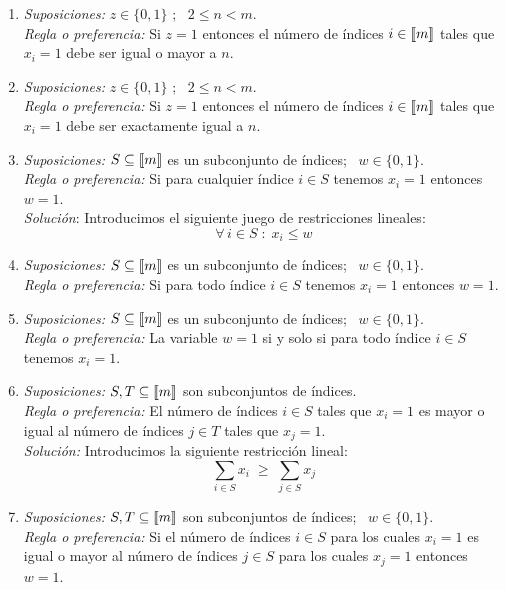 \documentclass[ a4paper, twoside, 11pt]{article}
\begin{document}
\begin{problem}
\begin{enumerate}[label=\alph*)]
\item \emph{Suposiciones:} $z \in \{ 0, 1\}$ ; \, $2 \leq n < m$. \\
\emph{Regla o preferencia:} Si $z = 1$ entonces el n\'umero de \'indices $i \in \llbracket m \rrbracket$ tales que $x_i = 1$ debe ser igual o mayor a $n$. 

\item \emph{Suposiciones:} $z \in \{ 0, 1\}$ ; \, $2 \leq n < m$. \\
\emph{Regla o preferencia:} Si $z = 1$ entonces el n\'umero de \'indices $i \in \llbracket m \rrbracket$ tales que $x_i = 1$ debe ser exactamente igual a $n$. 

\item \emph{Suposiciones:} $S \subseteq \llbracket m \rrbracket$ es un subconjunto de \'indices; \, $w \in \{ 0, 1\}$. \\
\emph{Regla o preferencia:} Si para cualquier \'indice $i \in S$ tenemos $x_i = 1$ entonces $w = 1$. \\[1ex]
\emph{Soluci\'on}: Introducimos el siguiente juego de restricciones lineales: 
\[
\forall \, i \in S \; \colon \; x_i \leq w
\]

\item \emph{Suposiciones:} $S \subseteq \llbracket m \rrbracket$ es un subconjunto de \'indices; \, $w \in \{ 0, 1\}$. \\
\emph{Regla o preferencia:} Si para todo \'indice $i \in S$ tenemos $x_i = 1$ entonces $w = 1$. 

\item \emph{Suposiciones:} $S \subseteq \llbracket m \rrbracket$ es un subconjunto de \'indices; \, $w \in \{ 0, 1\}$. \\
\emph{Regla o preferencia:} La variable $w = 1$ si y solo si para todo \'indice $i \in S$ tenemos $x_i = 1$. 

\item \emph{Suposiciones:} $S, T \subseteq \llbracket m \rrbracket$ son subconjuntos de \'indices. \\
\emph{Regla o preferencia:} El n\'umero de \'indices $i \in S$ tales que $x_i = 1$ es mayor o igual al n\'umero de \'indices $j \in T$ tales que $x_j = 1$. \\[1ex]
\emph{Soluci\'on:} Introducimos la siguiente restricci\'on lineal: 
\[
\sum_{i \in S} x_i \; \geq \; \sum_{j \in S} x_j
\]

\item \emph{Suposiciones:} $S, T \subseteq \llbracket m \rrbracket$ son subconjuntos de \'indices; \, $w \in \{ 0, 1\}$. \\
\emph{Regla o preferencia:} Si el n\'umero de \'indices $i \in S$ para los cuales $x_i = 1$ es igual o mayor al n\'umero de \'indices $j \in S$ para los cuales $x_j = 1$ entonces $w = 1$. 


\end{enumerate}
\end{problem}
\end{document}
